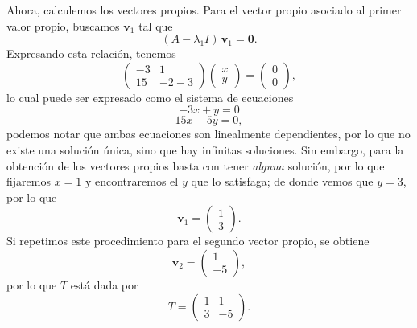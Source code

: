 \documentclass[
  11pt,
  letterpaper,
   addpoints,
   answers
  ]{exam}
\begin{document}
\begin{questions}
\begin{solution}
Ahora, calculemos los vectores propios. Para el vector propio asociado al primer valor propio,
buscamos $\mathbf{v}_1$ tal que
\begin{equation}
(A-\lambda_1 I)\,\mathbf{v}_1=\mathbf{0}.
\end{equation}
Expresando esta relación, tenemos
\begin{equation}
\begin{pmatrix}
-3 & 1\\
15 & -2-3
\end{pmatrix}
\begin{pmatrix}
x\\ y
\end{pmatrix}
=
\begin{pmatrix}
0\\ 0
\end{pmatrix},
\end{equation}
lo cual puede ser expresado como el sistema de ecuaciones
\begin{equation}
-3x+y=0
\end{equation}
\begin{equation}
15x-5y=0,
\end{equation}
podemos notar que ambas ecuaciones son linealmente dependientes, por lo que no existe una
solución única, sino que hay infinitas soluciones. Sin embargo, para la obtención de los vectores
propios basta con tener \emph{alguna} solución, por lo que fijaremos $x=1$ y encontraremos el $y$
que lo satisfaga; de donde vemos que $y=3$, por lo que
\begin{equation}
\mathbf{v}_1=\begin{pmatrix}1\\ 3\end{pmatrix}.
\end{equation}
Si repetimos este procedimiento para el segundo vector propio, se obtiene
\begin{equation}
\mathbf{v}_2=\begin{pmatrix}1\\ -5\end{pmatrix},
\end{equation}
por lo que $T$ está dada por
\begin{equation}
T=\begin{pmatrix}
1 & 1\\
3 & -5
\end{pmatrix}.
\end{equation}


\end{solution}
\end{questions}
\end{document}
